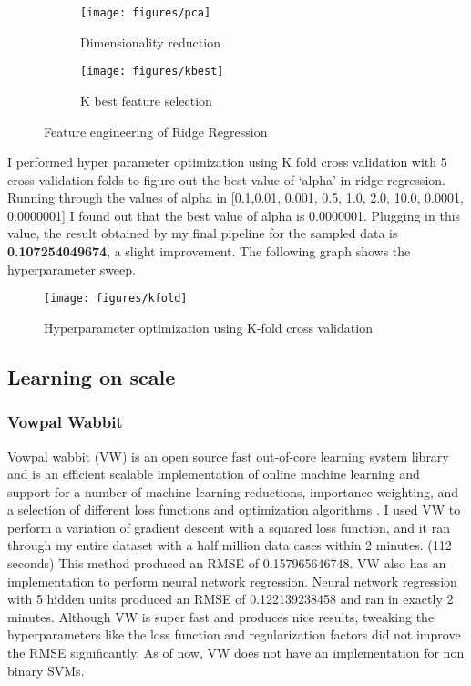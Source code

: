 \documentclass{article} %
\begin{document}
\begin{figure}[H]
	\begin{subfigure}{.5\textwidth}
		\centering
		\texttt{[image: figures/pca]}
		\caption{Dimensionality reduction}
		\label{pca}
	\end{subfigure} 
	\begin{subfigure}{.5\textwidth}
		\centering
		\texttt{[image: figures/kbest]}
		\caption{K best feature selection}
		\label{kbest}
	\end{subfigure} 
	\caption{Feature engineering of Ridge Regression}
\end{figure}

I performed hyper parameter optimization using K fold cross validation with 5 cross validation folds to figure out the best value of `alpha' in ridge regression. Running through the values of alpha in [0.1,0.01, 0.001, 0.5, 1.0, 2.0, 10.0, 0.0001, 0.0000001] I found out that the best value of alpha is 0.0000001. Plugging in this value, the result obtained by my final pipeline for the sampled data is \textbf{0.107254049674}, a slight improvement. The following graph shows the hyperparameter sweep.
\begin{figure}[H]
	\centering
	\texttt{[image: figures/kfold]}
	\caption{Hyperparameter optimization using K-fold cross validation}
	\label{kfold}
\end{figure} 


\subsection{Learning on scale}
\subsubsection{Vowpal Wabbit}
Vowpal wabbit (VW) is an open source fast out-of-core learning system library and is an efficient scalable implementation of online machine learning and support for a number of machine learning reductions, importance weighting, and a selection of different loss functions and optimization algorithms \cite{vw_wiki}. I used VW \cite{vw} to perform a variation of gradient descent with a squared loss function, and it ran through my entire dataset with a half million data cases within 2 minutes. (112 seconds) This method produced an RMSE of 0.157965646748. VW also has an implementation to perform neural network regression. Neural network regression with 5 hidden units produced an RMSE of 0.122139238458 and ran in exactly 2 minutes. Although VW is super fast and produces nice results, tweaking the hyperparameters like the loss function and regularization factors did not improve the RMSE significantly. As of now, VW does not have an implementation for non binary SVMs.
\end{document}
